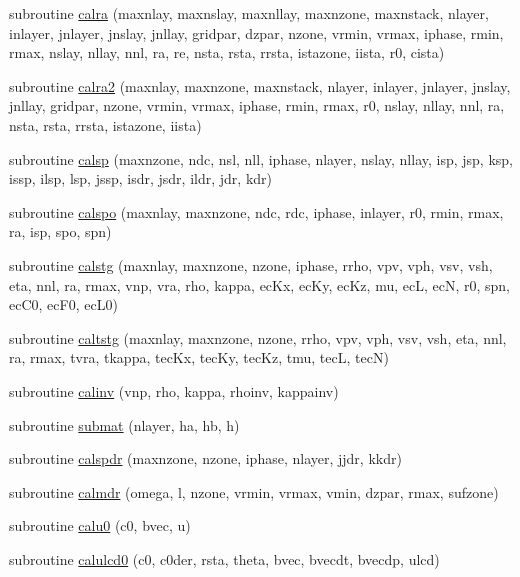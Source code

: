 \begin{DoxyCompactItemize}
\item 
subroutine \hyperlink{others_8f90_aff442b8cb1d988a8bdc39aadc7c0248c}{calra} (maxnlay, maxnslay, maxnllay, maxnzone, maxnstack, nlayer, inlayer, jnlayer, jnslay, jnllay, gridpar, dzpar, nzone, vrmin, vrmax, iphase, rmin, rmax, nslay, nllay, nnl, ra, re, nsta, rsta, rrsta, istazone, iista, r0, cista)
\item 
subroutine \hyperlink{others_8f90_a48ec89525e85d58c3280ceb3eac1f5a5}{calra2} (maxnlay, maxnzone, maxnstack, nlayer, inlayer, jnlayer, jnslay, jnllay, gridpar, nzone, vrmin, vrmax, iphase, rmin, rmax, r0, nslay, nllay, nnl, ra, nsta, rsta, rrsta, istazone, iista)
\item 
subroutine \hyperlink{others_8f90_a591f4c823891112ae7a18ced3977f827}{calsp} (maxnzone, ndc, nsl, nll, iphase, nlayer, nslay, nllay, isp, jsp, ksp, issp, ilsp, lsp, jssp, isdr, jsdr, ildr, jdr, kdr)
\item 
subroutine \hyperlink{others_8f90_aa0102beed40ef9603ca0b2e326397aa5}{calspo} (maxnlay, maxnzone, ndc, rdc, iphase, inlayer, r0, rmin, rmax, ra, isp, spo, spn)
\item 
subroutine \hyperlink{others_8f90_a183435c3a12bb0faa87a88bf9649f544}{calstg} (maxnlay, maxnzone, nzone, iphase, rrho, vpv, vph, vsv, vsh, eta, nnl, ra, rmax, vnp, vra, rho, kappa, ec\-Kx, ec\-Ky, ec\-Kz, mu, ec\-L, ec\-N, r0, spn, ec\-C0, ec\-F0, ec\-L0)
\item 
subroutine \hyperlink{others_8f90_a0df6b35f9173269fdb37239181473cfb}{caltstg} (maxnlay, maxnzone, nzone, rrho, vpv, vph, vsv, vsh, eta, nnl, ra, rmax, tvra, tkappa, tec\-Kx, tec\-Ky, tec\-Kz, tmu, tec\-L, tec\-N)
\item 
subroutine \hyperlink{others_8f90_a2a35856baff61b1567d2167555fe5ef8}{calinv} (vnp, rho, kappa, rhoinv, kappainv)
\item 
subroutine \hyperlink{others_8f90_a61267751b516aade609f0be71d8a6e08}{submat} (nlayer, ha, hb, h)
\item 
subroutine \hyperlink{others_8f90_a10114cbb123967b05c51c0fa5b2747de}{calspdr} (maxnzone, nzone, iphase, nlayer, jjdr, kkdr)
\item 
subroutine \hyperlink{others_8f90_aa31370d6971cf88e307eadedbb579b5a}{calmdr} (omega, l, nzone, vrmin, vrmax, vmin, dzpar, rmax, sufzone)
\item 
subroutine \hyperlink{others_8f90_a2dd50eea877683eb583c098e14dceeb1}{calu0} (c0, bvec, u)
\item 
subroutine \hyperlink{others_8f90_a1681b57cbaf7c8865e5723b08acef4e8}{calulcd0} (c0, c0der, rsta, theta, bvec, bvecdt, bvecdp, ulcd)

\end{DoxyCompactItemize}
